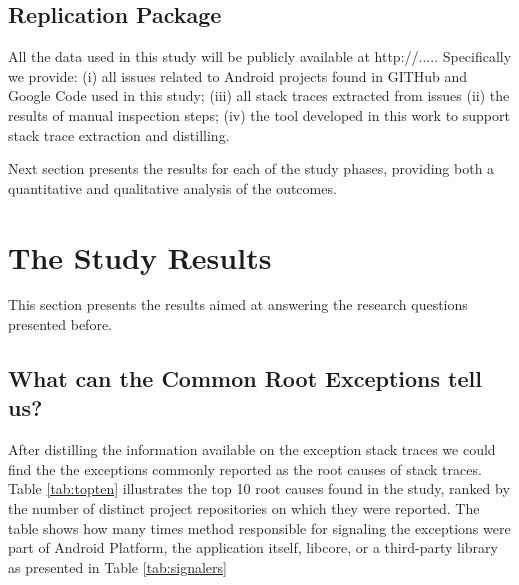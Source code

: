 \documentclass[conference]{IEEEtran}
\begin{document}





\subsection{Replication Package}
All the data used in this study will be publicly available at http://.....
Specifically we provide: (i) all issues related to Android projects found
in GITHub and Google Code used in this study; (iii) all stack traces extracted
from issues (ii) the results of manual inspection steps; (iv) the tool developed 
in this work to support stack trace extraction and distilling.

Next section presents the results for each of the study phases, providing both a
quantitative and qualitative analysis of the outcomes.

\section{The Study Results}
\label{sec:result}


This section presents the results aimed at answering the research 
questions presented before.

\subsection{What can the Common Root Exceptions tell us? }

After distilling the information available on the exception stack traces we could find 
the the exceptions commonly reported as the root causes of stack traces.
Table \ref{tab:topten} illustrates the top 10 root causes found in the study,
 ranked by the number of distinct project repositories on which they were reported. 
The table shows how many times method responsible for signaling the exceptions were
part of Android Platform, the application itself, libcore, or a third-party library as presented in Table  \ref{tab:signalers} 
\end{document}
